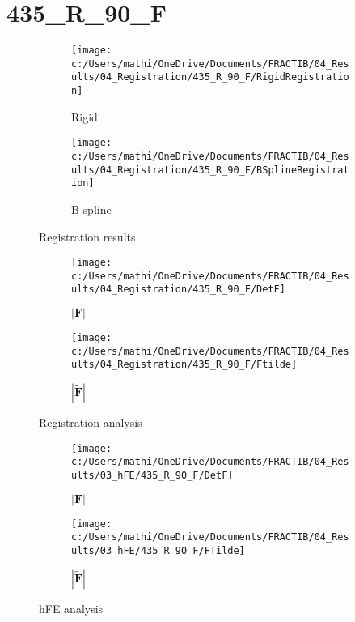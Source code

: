 \documentclass{article}%
\begin{document}
%
\newpage%
\section*{435\_R\_90\_F}%
\label{sec:435R90F}%


\begin{figure}[h!]%
\begin{subfigure}[b]{0.5\linewidth}%
\texttt{[image: c:/Users/mathi/OneDrive/Documents/FRACTIB/04\_Results/04\_Registration/435\_R\_90\_F/RigidRegistration]}%
\caption{Rigid}%
\end{subfigure}%
\begin{subfigure}[b]{0.5\linewidth}%
\texttt{[image: c:/Users/mathi/OneDrive/Documents/FRACTIB/04\_Results/04\_Registration/435\_R\_90\_F/BSplineRegistration]}%
\caption{B{-}spline}%
\end{subfigure}%
\caption{Registration results}%
\end{figure}

%


\begin{figure}[h!]%
\begin{subfigure}[b]{0.5\linewidth}%
\texttt{[image: c:/Users/mathi/OneDrive/Documents/FRACTIB/04\_Results/04\_Registration/435\_R\_90\_F/DetF]}%
\caption{$|\mathbf{F}|$}%
\end{subfigure}%
\begin{subfigure}[b]{0.5\linewidth}%
\texttt{[image: c:/Users/mathi/OneDrive/Documents/FRACTIB/04\_Results/04\_Registration/435\_R\_90\_F/Ftilde]}%
\caption{$|\widetilde{\mathbf{F}}|$}%
\end{subfigure}%
\caption{Registration analysis}%
\end{figure}

%


\begin{figure}[h!]%
\begin{subfigure}[b]{0.5\linewidth}%
\texttt{[image: c:/Users/mathi/OneDrive/Documents/FRACTIB/04\_Results/03\_hFE/435\_R\_90\_F/DetF]}%
\caption{$|\mathbf{F}|$}%
\end{subfigure}%
\begin{subfigure}[b]{0.5\linewidth}%
\texttt{[image: c:/Users/mathi/OneDrive/Documents/FRACTIB/04\_Results/03\_hFE/435\_R\_90\_F/FTilde]}%
\caption{$|\widetilde{\mathbf{F}}|$}%
\end{subfigure}%
\caption{hFE analysis}%
\end{figure}
\end{document}
